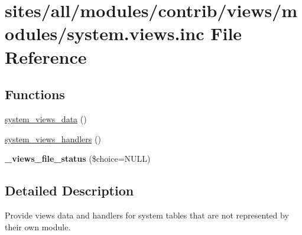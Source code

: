 \hypertarget{system_8views_8inc}{
\section{sites/all/modules/contrib/views/modules/system.views.inc File Reference}
\label{system_8views_8inc}
}
\subsection*{Functions}
\begin{CompactItemize}
\item 
\hyperlink{group__views__system__module_g9720aa1df32a1efc1bdaaf6f372c38c3}{system\_\-views\_\-data} ()
\item 
\hyperlink{group__views__system__module_g5ce933162702acb94a6e2c7f94107646}{system\_\-views\_\-handlers} ()
\item 
\hypertarget{group__views__system__module_gdbb8ffa6a78abd312f9145c6f2ec3403}{
\textbf{\_\-views\_\-file\_\-status} (\$choice=NULL)}
\label{group__views__system__module_gdbb8ffa6a78abd312f9145c6f2ec3403}

\end{CompactItemize}


\subsection{Detailed Description}
Provide views data and handlers for system tables that are not represented by their own module. 